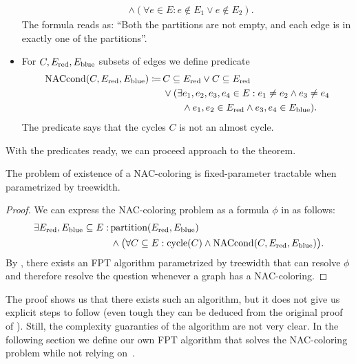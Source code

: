 \begin{itemize}
\begin{align*}
		                                              & \land (\forall e \in E : e \not\in E_1 \lor e \not\in E_2 ).
	      \end{align*}
	      The formula reads as: ``Both the partitions are not empty,
	      and each edge is in exactly one of the partitions''.
	\item For \( C, E_{\text{red}}, E_{\text{blue}} \) subsets of edges we define predicate
	      \begin{align*}
		      \text{NACcond}(C, E_{\text{red}}, E_{\text{blue}}) \coloneqq \,
		       & C \subseteq E_{\text{red}} \lor C \subseteq E_{\text{red}}
		      \\
		       & \lor (\exists e_1, e_2, e_3, e_4 \in E :
		      e_1 \ne e_2 \land e_3 \ne e_4
		      \\
		       & \qquad \land e_1, e_2 \in E_{\text{red}} \land e_3, e_4 \in E_{\text{blue}} ).
	      \end{align*}
	      The predicate says that the cycles \( C \) is not an almost cycle.
\end{itemize}
%

With the predicates ready, we can proceed approach to the theorem.
%
\begin{theorem}
	The problem of existence of a NAC-coloring is fixed-parameter
	tractable when parametrized by treewidth.
\end{theorem}
%
\begin{proof}
	We can express the NAC-coloring problem
	as a formula \( \phi \) in \MSO{} as follows:
	\begin{align*}
		\exists E_{\text{red}}, E_{\text{blue}} \subseteq E : \,
		 & \text{partition}(E_{\text{red}}, E_{\text{blue}})                                                                 \\
		 & \land \big(\forall C \subseteq E : \text{cycle}(C) \land \text{NACcond}(C, E_{\text{red}}, E_{\text{blue}}) \big)
		.
	\end{align*}
	By ,
	there exists an FPT algorithm parametrized by treewidth
	that can resolve \( \phi \) and therefore resolve the question whenever a graph has a NAC-coloring.
\end{proof}
%
The proof shows us that there exists such an algorithm,
but it does not give us explicit steps to follow
(even tough they can be deduced from the original proof of ).
Still, the complexity guaranties of the algorithm are not very clear.
In the following section we define our
own FPT algorithm that solves the NAC-coloring problem
while not relying on~\MSO{}.



